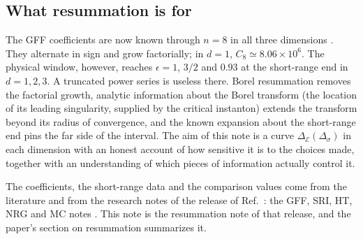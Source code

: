 \documentclass[11pt,a4paper]{article}
\numberwithin{equation}{section}
\newcommand{\De}{\Delta_{\mathcal E}}   %
\newcommand{\Ds}{\Delta_\sigma}
\newcommand{\sci}[2]{#1\times10^{#2}}
\begin{document}
\subsection{What resummation is for}
The GFF coefficients are now known through $n=8$ in all three dimensions
\cite{noteGFF}. They
alternate in sign and grow factorially; in $d=1$, $C_8\simeq\sci{8.06}{6}$. The
physical window, however, reaches $\epsilon=1$, $3/2$ and $0.93$ at the short-range end
in $d=1,2,3$. A truncated power series is useless there. Borel resummation removes the
factorial growth, analytic information about the Borel transform (the location of its
leading singularity, supplied by the critical instanton) extends the transform beyond
its radius of convergence, and the known expansion about the short-range end pins the
far side of the interval. The aim of this note is a curve $\De(\Ds)$ in each dimension
with an honest account of how sensitive it is to the choices made, together with an
understanding of which pieces of information actually control it.

The coefficients, the short-range data and the comparison values come from the literature
and from the research notes of the release of Ref.~\cite{LRIpaper}: the GFF, SRI, HT, NRG and
MC notes \cite{noteGFF,noteSRI,noteHT,noteNRG,noteMC}. This note is the resummation note of
that release, and the paper's section on resummation summarizes it.
\end{document}
